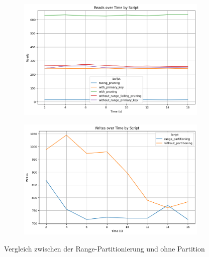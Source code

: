 \vspace{-8pt}
\begin{figure}[H]
	\centering
	\begin{subfigure}[t]{0.48\textwidth}
		\centering
		\includegraphics[width=\textwidth]{PNGs/Script/Partition/range-partition/Reads}
		\label{range-partition-reads}
	\end{subfigure}
	\hfill
	\begin{subfigure}[t]{0.48\textwidth}
		\centering
		\includegraphics[width=\textwidth]{PNGs/Script/Partition/range-partition/Writes}
		\label{range-partition-writes}
	\end{subfigure}
	\vspace{-20pt}
	\caption[Range-Partitionierung: Metrikvergleich]{Vergleich zwischen der Range-Partitionierung und ohne Partition}
	\label{fig:range-partition}
\end{figure}
\vspace{-20pt}

